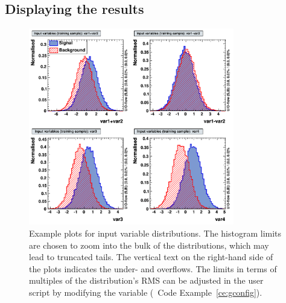 \subsection{Displaying the results}
\label{sec:displayingResults}

\begin{figure}[!t]
\begin{center}
  \includegraphics[width=0.8\textwidth]{plots/variables_c1}
\end{center}
  \vspace{-0.5cm}
\caption[.]{Example plots for input variable distributions. The histogram
            limits are chosen to zoom into the bulk of the distributions, which
            may lead to truncated tails. The vertical text on the 
            right-hand side of the plots indicates the under- and overflows.
            The limits in terms of multiples of the distribution's RMS can 
            be adjusted in the user script by modifying the variable
             (\cf\  
            Code Example~\ref{ce:gconfig}). }
\label{fig:usingtmva:variables}
\end{figure}

